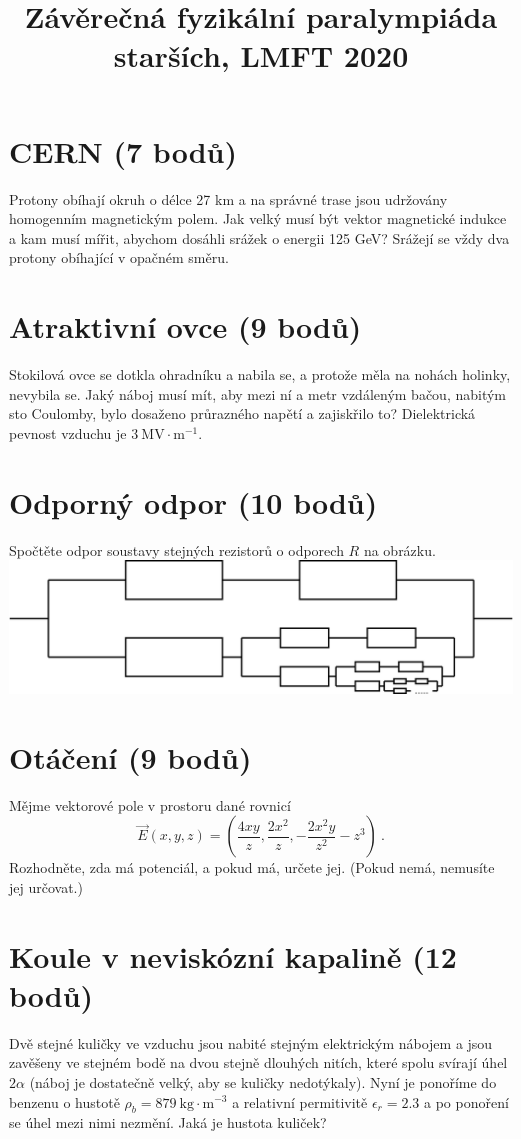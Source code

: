 \documentclass[10pt,a4paper,landscape,twocolumn]{article}
\title{Závěrečná fyzikální paralympiáda starších, LMFT 2020}
\date{}
\begin{document}
\maketitle
\thispagestyle{empty}

\section{CERN (7 bodů)}
Protony obíhají okruh o délce 27 km a na správné trase jsou udržovány homogenním magnetickým polem. Jak velký musí být vektor magnetické indukce a kam musí mířit, abychom dosáhli srážek o energii 125 GeV? Srážejí se vždy dva protony obíhající v opačném směru.

\section{Atraktivní ovce (9 bodů)}
Stokilová ovce se dotkla ohradníku a nabila se, a protože měla na nohách holinky, nevybila se. Jaký náboj musí mít, aby mezi ní a metr vzdáleným bačou, nabitým sto Coulomby, bylo dosaženo průrazného napětí a zajiskřilo to? Dielektrická pevnost vzduchu je $3~\mathrm{MV}\cdot\mathrm{m}^{-1}$.

\section{Odporný odpor (10 bodů)}
Spočtěte odpor soustavy stejných rezistorů o odporech $R$ na obrázku.
\includegraphics[scale=0.05]{img/odpor.jpg}

\section{Otáčení (9 bodů)}
Mějme vektorové pole v prostoru dané rovnicí
\begin{equation*}
\vec{E}\left(x, y, z\right) = \left(\frac{4xy}{z}, \frac{2x^2}{z}, -\frac{2x^2y}{z^2} - z^3\right)~.
\end{equation*}
Rozhodněte, zda má potenciál, a pokud má, určete jej. (Pokud nemá, nemusíte jej určovat.)

\section{Koule v neviskózní kapalině (12 bodů)}
Dvě stejné kuličky ve vzduchu jsou nabité stejným elektrickým nábojem a jsou zavěšeny ve stejném bodě na dvou stejně dlouhých nitích, které spolu svírají úhel $2\alpha$ (náboj je dostatečně velký, aby se kuličky nedotýkaly). Nyní je ponoříme do benzenu o hustotě $\rho_b = 879~\mathrm{kg}\cdot\mathrm{m}^{-3}$ a relativní permitivitě $\epsilon_r = 2.3$ a po ponoření se úhel mezi nimi nezmění. Jaká je hustota kuliček?
\end{document}
